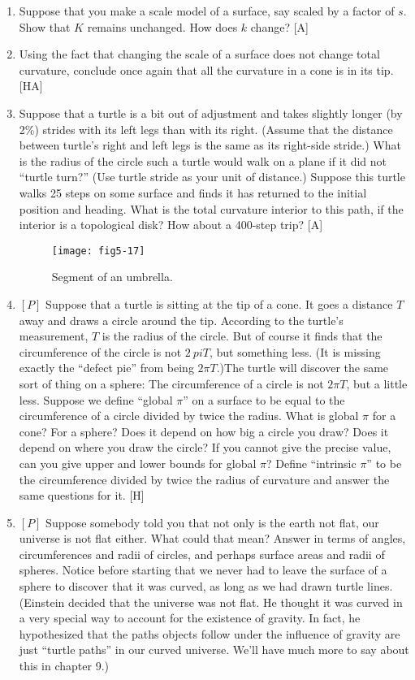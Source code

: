 \documentclass{book}
\begin{document}
\begin{enumerate}
\item Suppose that you make a scale model of a surface, say scaled by a
factor of $s$. Show that $K$ remains unchanged. How does $k$ change? [A]

\item Using the fact that changing the scale of a surface does not change
total curvature, conclude once again that all the curvature in a cone is
in its tip. [HA]

\item Suppose that a turtle is a bit out of adjustment and takes slightly
longer (by 2\%) strides with its left legs than with its right. (Assume
that the distance between turtle's right and left legs is the same as its
right-side stride.) What is the radius of the circle such a turtle would
walk on a plane if it did not ``turtle turn?'' (Use turtle stride as your
unit of distance.) Suppose this turtle walks 25 steps on some surface
and finds it has returned to the initial position and heading. What is
the total curvature interior to this path, if the interior is a topological
disk? How about a 400-step trip? [A]

\begin{figure}
\begin{center}
\texttt{[image: fig5-17]}
\caption{Segment of an umbrella.}
\end{center}
\end{figure}


\item $[P]$ Suppose that a turtle is sitting at the tip of a cone. It goes a
distance $T$ away and draws a circle around the tip. According to the
turtle's measurement, $T$ is the radius of the circle. But of course it finds
that the circumference of the circle is not $2 \ pi T$, but something less. (It is
missing exactly the ``defect pie'' from being $2 \pi T$.)The turtle will discover
the same sort of thing on a sphere: The circumference of a circle is not
$2 \pi T$, but a little less. Suppose we define ``global $\pi$'' on a surface to be
equal to the circumference of a circle divided by twice the radius. What
is global $\pi$ for a cone? For a sphere? Does it depend on how big a
circle you draw? Does it depend on where you draw the circle? If you
cannot give the precise value, can you give upper and lower bounds for
global $\pi$? Define ``intrinsic $\pi$'' to be the circumference divided by twice
the radius of curvature and answer the same questions for it. [H]

\item $[P]$ Suppose somebody told you that not only is the earth not flat,
our universe is not flat either. What could that mean? Answer in terms
of angles, circumferences and radii of circles, and perhaps surface areas
and radii of spheres. Notice before starting that we never had to leave
the surface of a sphere to discover that it was curved, as long as we had
drawn turtle lines. (Einstein decided that the universe was not flat. He
thought it was curved in a very special way to account for the existence
of gravity. In fact, he hypothesized that the paths objects follow under
the influence of gravity are just ``turtle paths'' in our curved universe.
We'll have much more to say about this in chapter 9.)


\end{enumerate}
\end{document}
